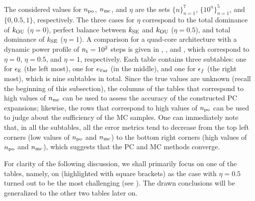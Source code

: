 The considered values for ${n_\text{po}}$, ${n_\text{mc}}$, and $\eta$ are the sets $\{ n \}_{n = 1}^7$, $\{ 10^n \}_{n = 1}^5$, and $\{ 0, 0.5, 1 \}$, respectively.
The three cases for $\eta$ correspond to the total dominance of $\fCorr_\OU$ ($\eta = 0$), perfect balance between $\fCorr_\SE$ and $\fCorr_\OU$ ($\eta = 0.5$), and total dominance of $\fCorr_\SE$ ($\eta = 1$).
A comparison for a quad-core architecture with a dynamic power profile of ${n_\text{t}} = 10^2$ steps is given in , , and , which correspond to $\eta = 0$, $\eta = 0.5$, and $\eta = 1$, respectively.
Each table contains three subtables: one for $\epsilon_\mathbb{E}$ (the left most), one for $\epsilon_{\mathbb{V}\text{ar}}$ (in the middle), and one for $\epsilon_f$ (the right most), which is nine subtables in total.
Since the true values are unknown (recall the beginning of this subsection), the columns of the tables that correspond to high values of ${n_\text{mc}}$ can be used to assess the accuracy of the constructed PC expansions; likewise, the rows that correspond to high values of ${n_\text{po}}$ can be used to judge about the sufficiency of the MC samples.
One can immediately note that, in all the subtables, all the error metrics tend to decrease from the top left corners (low values of ${n_\text{po}}$ and ${n_\text{mc}}$) to the bottom right corners (high values of ${n_\text{po}}$ and ${n_\text{mc}}$), which suggests that the PC and MC methods converge.

For clarity of the following discussion, we shall primarily focus on one of the tables, namely, on  (highlighted with square brackets) as the case with $\eta = 0.5$ turned out to be the most challenging (see ).
The drawn conclusions will be generalized to the other two tables later on.

